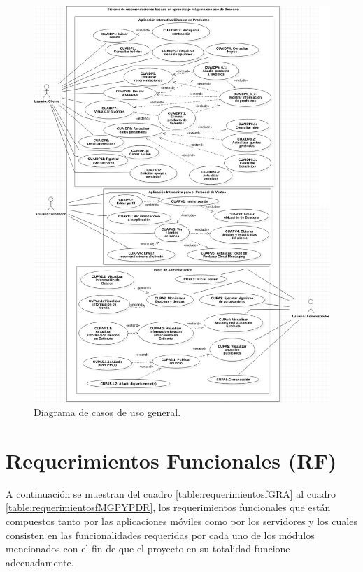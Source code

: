 \FloatBarrier
\begin{figure}[htbp!]
		\centering
			\includegraphics[width=1 \textwidth]{imagenes/casosGenerales1}
		\caption{Diagrama de casos de uso general.}
		\label{image:casosdeusogenerales}
\end{figure}
\FloatBarrier

\section{Requerimientos Funcionales (RF)}
A continuación se muestran del cuadro \ref{table:requerimientosfGRA} al cuadro \ref{table:requerimientosfMGPYPDR}, los requerimientos funcionales que están compuestos tanto por las aplicaciones móviles como por los servidores y los cuales consisten en las funcionalidades requeridas por cada uno de los módulos mencionados con el fin de que el proyecto en su totalidad funcione adecuadamente.\\

